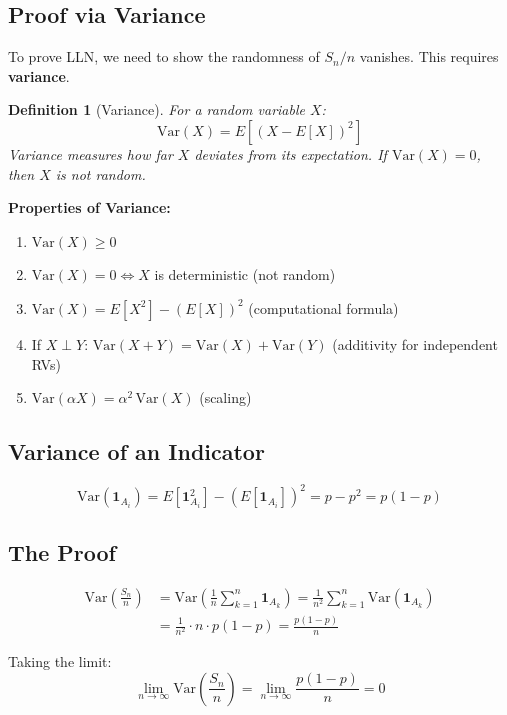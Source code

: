 \documentclass[11pt]{article}
\newtheorem{definition}{Definition}
\begin{document}
\subsection{Proof via Variance}

To prove LLN, we need to show the randomness of $S_n/n$ vanishes. This requires \textbf{variance}.

\begin{definition}[Variance]
For a random variable $X$:
\[
\text{Var}(X) = E\!\left[(X - E[X])^2\right]
\]
Variance measures how far $X$ deviates from its expectation. If $\text{Var}(X) = 0$, then $X$ is not random.
\end{definition}

\textbf{Properties of Variance:}
\begin{enumerate}[nosep]
  \item $\text{Var}(X) \geq 0$
  \item $\text{Var}(X) = 0 \iff X$ is deterministic (not random)
  \item $\text{Var}(X) = E[X^2] - (E[X])^2$ \hfill (computational formula)
  \item If $X \perp Y$: $\text{Var}(X + Y) = \text{Var}(X) + \text{Var}(Y)$ \hfill (additivity for independent RVs)
  \item $\text{Var}(\alpha X) = \alpha^2 \, \text{Var}(X)$ \hfill (scaling)
\end{enumerate}

\subsection{Variance of an Indicator}

\[
\text{Var}(\mathbf{1}_{A_i}) = E[\mathbf{1}_{A_i}^2] - (E[\mathbf{1}_{A_i}])^2 = p - p^2 = p(1-p)
\]

\subsection{The Proof}

\begin{align*}
\text{Var}\!\left(\frac{S_n}{n}\right)
&= \text{Var}\!\left(\frac{1}{n}\sum_{k=1}^{n} \mathbf{1}_{A_k}\right)
= \frac{1}{n^2} \sum_{k=1}^{n} \text{Var}(\mathbf{1}_{A_k})  \tag{Properties 5 \& 4}\\
&= \frac{1}{n^2} \cdot n \cdot p(1-p) = \frac{p(1-p)}{n}
\end{align*}

Taking the limit:
\[
\lim_{n \to \infty} \text{Var}\!\left(\frac{S_n}{n}\right) = \lim_{n \to \infty} \frac{p(1-p)}{n} = 0
\]
\end{document}
